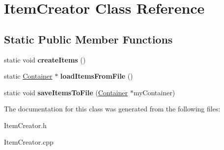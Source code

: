 \hypertarget{class_item_creator}{}\section{Item\+Creator Class Reference}
\label{class_item_creator}
\subsection*{Static Public Member Functions}
\begin{DoxyCompactItemize}
\item 
\hypertarget{class_item_creator_a77e6cb2cf03ff0b57fdef8ed8a9ae68a}{}\label{class_item_creator_a77e6cb2cf03ff0b57fdef8ed8a9ae68a} 
static void {\bfseries create\+Items} ()
\item 
\hypertarget{class_item_creator_a8a2280445e40eb28e6bdb7dd77f35d71}{}\label{class_item_creator_a8a2280445e40eb28e6bdb7dd77f35d71} 
static \hyperlink{class_container}{Container} $\ast$ {\bfseries load\+Items\+From\+File} ()
\item 
\hypertarget{class_item_creator_a2e8e57784920cf17cbeb4001e1e23f58}{}\label{class_item_creator_a2e8e57784920cf17cbeb4001e1e23f58} 
static void {\bfseries save\+Items\+To\+File} (\hyperlink{class_container}{Container} $\ast$my\+Container)
\end{DoxyCompactItemize}


The documentation for this class was generated from the following files\+:\begin{DoxyCompactItemize}
\item 
Item\+Creator.\+h\item 
Item\+Creator.\+cpp\end{DoxyCompactItemize}
